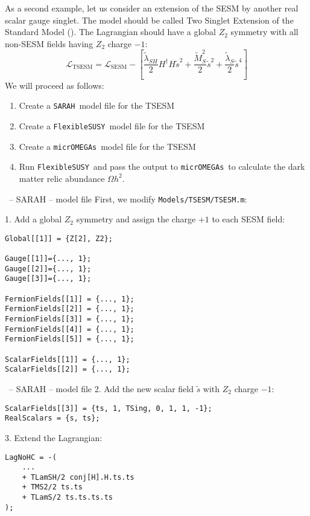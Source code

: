 \documentclass[11pt]{beamer}
\newcommand{\FlexibleSUSY}{\texttt{FlexibleSUSY}}
\newcommand{\Lagr}{\mathcal{L}}
\newcommand{\micrOMEGAs}{\texttt{micrOMEGAs}}
\newcommand{\SARAH}{\texttt{SARAH}}
\newcommand{\SESM}{\text{SESM}}
\newcommand{\TSESM}{\text{TSESM}}
\begin{document}
\begin{frame}{\insertsection}
  As a second example, let us consider an extension of the SESM by
  another real scalar gauge singlet. The model should be called Two
  Singlet Extension of the Standard Model (\TSESM). The Lagrangian
  should have a global $Z_2$ symmetry with all non-SESM fields having
  $Z_2$ charge $-1$:
  \begin{equation*}
    \Lagr_{\TSESM} = \Lagr_{\SESM} - \left[\frac{\tilde\lambda_{SH}}{2} H^\dagger H \tilde{s}^2 + \frac{\tilde{M}_S^2}{2} \tilde{s}^2 + \frac{\tilde{\lambda}_S}{2} \tilde{s}^4\right]
  \end{equation*}
  We will proceed as follows:
  \begin{enumerate}
  \item Create a \SARAH\ model file for the TSESM
  \item Create a \FlexibleSUSY\ model file for the TSESM
  \item Create a \micrOMEGAs\ model file for the TSESM
  \item Run \FlexibleSUSY\ and pass the output to \micrOMEGAs\ to
    calculate the dark matter relic abundance $\Omega h^2$.
  \end{enumerate}
\end{frame}


\begin{frame}[fragile]{\insertsection\ -- SARAH -- model file}
  First, we modify \texttt{Models/TSESM/TSESM.m}:

  \medskip

  1. Add a global $Z_2$ symmetry and assign the charge $+1$ to each SESM
  field:
  \begin{lstlisting}
Global[[1]] = {Z[2], Z2};

Gauge[[1]]={..., 1};
Gauge[[2]]={..., 1};
Gauge[[3]]={..., 1};

FermionFields[[1]] = {..., 1};
FermionFields[[2]] = {..., 1};
FermionFields[[3]] = {..., 1};
FermionFields[[4]] = {..., 1};
FermionFields[[5]] = {..., 1};

ScalarFields[[1]] = {..., 1};
ScalarFields[[2]] = {..., 1};\end{lstlisting}
\end{frame}


\begin{frame}[fragile]{\insertsection\ -- SARAH -- model file}
  2. Add the new scalar field $\tilde{s}$ with $Z_2$ charge $-1$:
  \begin{lstlisting}
ScalarFields[[3]] = {ts, 1, TSing, 0, 1, 1, -1};
RealScalars = {s, ts};\end{lstlisting}
  3. Extend the Lagrangian:
  \begin{lstlisting}
LagNoHC = -(
    ...
    + TLamSH/2 conj[H].H.ts.ts
    + TMS2/2 ts.ts
    + TLamS/2 ts.ts.ts.ts
);\end{lstlisting}
\end{frame}


\end{document}
